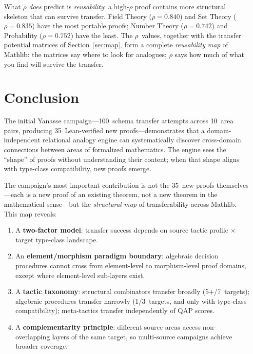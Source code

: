 \documentclass[11pt]{article}
\theoremstyle{definition}
\theoremstyle{remark}
\begin{document}
What $\rho$ \emph{does} predict is \emph{reusability}: a high-$\rho$
proof contains more structural skeleton that can survive transfer.
Field Theory ($\rho = 0.840$) and Set Theory ($\rho = 0.835$)
have the most portable proofs; Number Theory ($\rho = 0.742$)
and Probability ($\rho = 0.752$) have the least.  The
$\rho$~values, together with the transfer potential matrices of
Section~\ref{sec:map}, form a complete \emph{reusability map} of
Mathlib: the matrices say where to look for analogues; $\rho$
says how much of what you find will survive the transfer.

\section{Conclusion}\label{sec:conclusion}

The initial Yanasse campaign---100~schema transfer attempts across
10~area pairs, producing 35~Lean-verified new proofs---demonstrates
that a domain-independent relational analogy engine can systematically
discover cross-domain connections between areas of formalized
mathematics.  The engine sees the ``shape'' of proofs without
understanding their content; when that shape aligns with type-class
compatibility, new proofs emerge.

The campaign's most important contribution is not the 35~new proofs
themselves---each is a new proof of an existing theorem, not a new
theorem in the mathematical sense---but the \emph{structural map} of
transferability across Mathlib.  This map reveals:

\begin{enumerate}
\item A \textbf{two-factor model}: transfer success depends on
  source tactic profile $\times$ target type-class landscape.

\item An \textbf{element/morphism paradigm boundary}: algebraic
  decision procedures cannot cross from element-level to
  morphism-level proof domains, except where element-level
  sub-layers exist.

\item A \textbf{tactic taxonomy}: structural combinators transfer
  broadly (5+/7~targets); algebraic procedures transfer narrowly
  (1/3~targets, and only with type-class compatibility);
  meta-tactics transfer independently of QAP scores.

\item A \textbf{complementarity principle}: different source areas
  access non-overlapping layers of the same target, so multi-source
  campaigns achieve broader coverage.
\end{enumerate}
\end{document}
